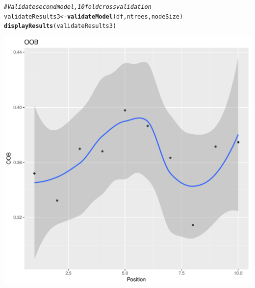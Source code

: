 \documentclass{article}\usepackage[]{graphicx}\usepackage[]{color}
\makeatletter
\def\maxwidth{ %
  \ifdim\Gin@nat@width>\linewidth
    \linewidth
  \else
    \Gin@nat@width
  \fi
}
\newcommand{\hlcom}[1]{\textcolor[rgb]{0.678,0.584,0.686}{\textit{#1}}}%
\newcommand{\hlstd}[1]{\textcolor[rgb]{0.345,0.345,0.345}{#1}}%
\newcommand{\hlkwb}[1]{\textcolor[rgb]{0.69,0.353,0.396}{#1}}%
\newcommand{\hlkwd}[1]{\textcolor[rgb]{0.737,0.353,0.396}{\textbf{#1}}}%
\newenvironment{kframe}{%
 \def\at@end@of@kframe{}%
 \ifinner\ifhmode%
  \def\at@end@of@kframe{\end{minipage}}%
  \begin{minipage}{\columnwidth}%
 \fi\fi%
 \def\FrameCommand##1{\hskip\@totalleftmargin \hskip-\fboxsep
 \colorbox{shadecolor}{##1}\hskip-\fboxsep
     \hskip-\linewidth \hskip-\@totalleftmargin \hskip\columnwidth}%
 \MakeFramed {\advance\hsize-\width
   \@totalleftmargin\z@ \linewidth\hsize
   \@setminipage}}%
 {\par\unskip\endMakeFramed%
 \at@end@of@kframe}
\newenvironment{knitrout}{}{} %
\makeatother
\begin{document}
\begin{knitrout}
\color{fgcolor}\begin{kframe}
\begin{alltt}
\hlcom{#Validate second model, 10 fold cross validation }
\hlstd{validateResults3}\hlkwb{<-}\hlkwd{validateModel}\hlstd{(df,ntrees,nodeSize)}
\hlkwd{displayResults}\hlstd{(validateResults3)}
\end{alltt}


{\ttfamily\noindent\itshape\color{messagecolor}{\#\# `geom\_smooth()` using method = 'loess'}}\end{kframe}
\includegraphics[width=\maxwidth]{figure/unnamed-chunk-39-1} 
\begin{kframe}


\end{kframe}
\end{knitrout}
\end{document}
